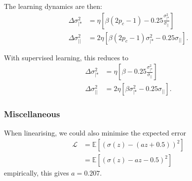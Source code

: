 \documentclass{article}
\renewcommand\b\bm
\begin{document}
The learning dynamics are then:
\begin{align}
    \Delta \sigma_{|*}^2 &= \eta \left [  \beta (2 p_c - 1) - 0.25 \frac{\sigma_{|*}^2}{\sigma_{||}} \right ]\\
    \Delta \sigma_{||}^2 &= 2 \eta \left [  \beta (2 p_c - 1) \sigma_{|*}^2 - 0.25 \sigma_{||} \right ].
\end{align}

With supervised learning, this reduces to
\begin{align}
    \Delta \sigma_{|*}^2 &= \eta \left [  \beta - 0.25 \frac{\sigma_{|*}^2}{\sigma_{||}} \right ]\\
    \Delta \sigma_{||}^2 &= 2 \eta \left [  \beta \sigma_{|*}^2 - 0.25 \sigma_{||} \right ].
\end{align}

\subsubsection*{Miscellaneous}

When linearising, we could also minimise the expected error
\begin{align}
    \mathcal{L} &= \mathbb{E} [(\sigma(z) - (az + 0.5))^2]\\
    &= \mathbb{E} [(\sigma(z) - az - 0.5)^2]
\end{align}
empirically, this gives $a = 0.207$.

\newpage

\end{document}
